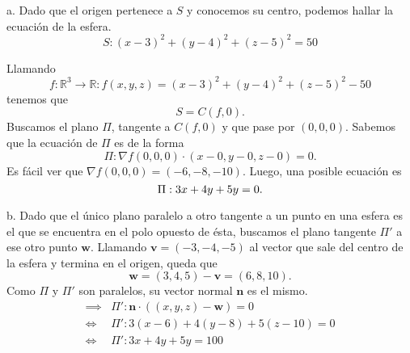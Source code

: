 
\begin{solution}
    a. Dado que el origen pertenece a $S$ y conocemos su centro, podemos hallar la ecuación de la esfera.
    \[
        S:(x-3)^2 + (y-4)^2 + (z-5)^2 = 50
    \]
    \begin{center}
    \end{center}

    Llamando $$f:\mathbb{R}^3 \rightarrow \mathbb{R}:  f(x,y,z) = (x-3)^2 + (y-4)^2 + (z-5)^2 - 50$$
    tenemos que $$S=C(f,0). $$
    Buscamos el plano $\Pi$, tangente a $C(f,0)$ y que pase por $(0,0,0)$. Sabemos que la ecuación de  $\Pi$  es  de la forma
    \[
        \Pi:\nabla f(0,0,0) \cdot (x-0,y-0,z-0) = 0.
    \]
    Es f\'acil ver que $\nabla f(0,0,0) = (-6,-8,-10).$  Luego, una posible ecuaci\'on es
    \[\\[1pt]
        \Pi: 3x + 4y + 5y = 0.
    \]

    b. Dado que el único plano paralelo a otro tangente a un punto en una esfera es el que se encuentra en el polo opuesto de ésta, buscamos el plano tangente $\Pi'$ a ese otro punto $\mathbf{w}$. Llamando $\mathbf{v} = (-3,-4,-5)$ al vector que sale del centro de la esfera y termina en el origen, queda que
    \[
        \mathbf{w} = (3,4,5) - \mathbf{v} = (6,8,10).
    \]
    Como $\Pi$ y $\Pi'$ son paralelos, su vector normal $\textbf{n}$ es el mismo.
    \[
        \begin{aligned}
            \implies & \Pi ': \textbf{n} \cdot ((x,y,z) - \mathbf{w}) = 0 \\
            \iff     & \Pi ': 3(x-6) + 4(y-8) + 5(z-10) = 0               \\
            \iff     & \Pi ':3x + 4y + 5y = 100
        \end{aligned}
    \]


\end{solution}
